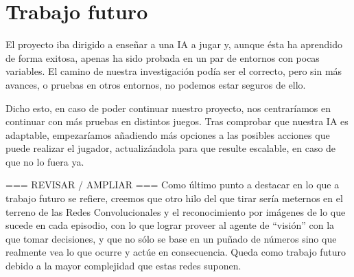 \section{Trabajo futuro}

El proyecto iba dirigido a enseñar a una IA a jugar y, aunque ésta ha aprendido de forma exitosa, apenas ha sido probada en un par de entornos con pocas variables. El camino de nuestra investigación podía ser el correcto, pero sin más avances, o pruebas en otros entornos, no podemos estar seguros de ello. 

Dicho esto, en caso de poder continuar nuestro proyecto, nos centraríamos en continuar con más pruebas en distintos juegos. Tras comprobar que nuestra IA es adaptable, empezaríamos añadiendo más opciones a las posibles acciones que puede realizar el jugador, actualizándola para que resulte escalable, en caso de que no lo fuera ya. 

=== REVISAR / AMPLIAR ===
Como último punto a destacar en lo que a trabajo futuro se refiere, creemos que otro hilo del que tirar sería meternos en el terreno de las Redes Convolucionales y el reconocimiento por imágenes de lo que sucede en cada episodio, con lo que lograr proveer al agente de ``visión''  con la que tomar decisiones, y que no sólo se base en un puñado de números sino que realmente vea lo que ocurre y actúe en consecuencia. Queda como trabajo futuro debido a la mayor complejidad que estas redes suponen.

